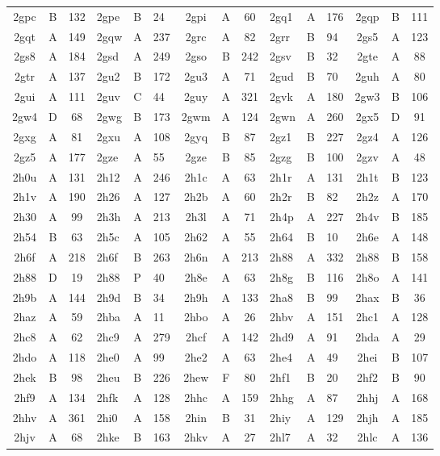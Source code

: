 \begin{longtable}{|c|c|c| a|a|a| c|c|c| a|a|a| c|c|c|}
2gpc & B & 132 & 2gpe & B & 24 & 2gpi & A & 60 & 2gq1 & A & 176 & 2gqp & B & 111\\
2gqt & A & 149 & 2gqw & A & 237 & 2grc & A & 82 & 2grr & B & 94 & 2gs5 & A & 123\\
2gs8 & A & 184 & 2gsd & A & 249 & 2gso & B & 242 & 2gsv & B & 32 & 2gte & A & 88\\
2gtr & A & 137 & 2gu2 & B & 172 & 2gu3 & A & 71 & 2gud & B & 70 & 2guh & A & 80\\
2gui & A & 111 & 2guv & C & 44 & 2guy & A & 321 & 2gvk & A & 180 & 2gw3 & B & 106\\
2gw4 & D & 68 & 2gwg & B & 173 & 2gwm & A & 124 & 2gwn & A & 260 & 2gx5 & D & 91\\
2gxg & A & 81 & 2gxu & A & 108 & 2gyq & B & 87 & 2gz1 & B & 227 & 2gz4 & A & 126\\
2gz5 & A & 177 & 2gze & A & 55 & 2gze & B & 85 & 2gzg & B & 100 & 2gzv & A & 48\\
2h0u & A & 131 & 2h12 & A & 246 & 2h1c & A & 63 & 2h1r & A & 131 & 2h1t & B & 123\\
2h1v & A & 190 & 2h26 & A & 127 & 2h2b & A & 60 & 2h2r & B & 82 & 2h2z & A & 170\\
2h30 & A & 99 & 2h3h & A & 213 & 2h3l & A & 71 & 2h4p & A & 227 & 2h4v & B & 185\\
2h54 & B & 63 & 2h5c & A & 105 & 2h62 & A & 55 & 2h64 & B & 10 & 2h6e & A & 148\\
2h6f & A & 218 & 2h6f & B & 263 & 2h6n & A & 213 & 2h88 & A & 332 & 2h88 & B & 158\\
2h88 & D & 19 & 2h88 & P & 40 & 2h8e & A & 63 & 2h8g & B & 116 & 2h8o & A & 141\\
2h9b & A & 144 & 2h9d & B & 34 & 2h9h & A & 133 & 2ha8 & B & 99 & 2hax & B & 36\\
2haz & A & 59 & 2hba & A & 11 & 2hbo & A & 26 & 2hbv & A & 151 & 2hc1 & A & 128\\
2hc8 & A & 62 & 2hc9 & A & 279 & 2hcf & A & 142 & 2hd9 & A & 91 & 2hda & A & 29\\
2hdo & A & 118 & 2he0 & A & 99 & 2he2 & A & 63 & 2he4 & A & 49 & 2hei & B & 107\\
2hek & B & 98 & 2heu & B & 226 & 2hew & F & 80 & 2hf1 & B & 20 & 2hf2 & B & 90\\
2hf9 & A & 134 & 2hfk & A & 128 & 2hhc & A & 159 & 2hhg & A & 87 & 2hhj & A & 168\\
2hhv & A & 361 & 2hi0 & A & 158 & 2hin & B & 31 & 2hiy & A & 129 & 2hjh & A & 185\\
2hjv & A & 68 & 2hke & B & 163 & 2hkv & A & 27 & 2hl7 & A & 32 & 2hlc & A & 136\\

\end{longtable}
